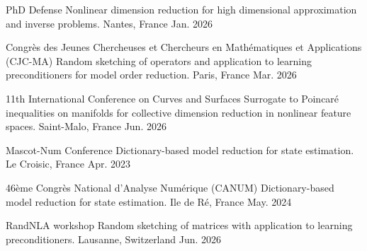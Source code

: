 \begin{cvpresentations}

\cvpresentation
{PhD Defense} %
{Nonlinear dimension reduction for high dimensional approximation and inverse problems.} %
{Nantes, France} %
{Jan. 2026} %


\cvpresentation
{Congr\`es des Jeunes Chercheuses et Chercheurs en Mathématiques et Applications (CJC-MA)} %
{Random sketching of operators and application to learning preconditioners for model order reduction.} %
{Paris, France} %
{Mar. 2026} %


\cvpresentation
{11th International Conference on Curves and Surfaces} %
{Surrogate to Poincaré inequalities on manifolds for collective dimension reduction in nonlinear feature spaces.} %
{Saint-Malo, France} %
{Jun. 2026} %

\end{cvpresentations}


\begin{cvpresentations}


\cvpresentation
{Mascot-Num Conference} %
{Dictionary-based model reduction for state estimation.} %
{Le Croisic, France} %
{Apr. 2023} %


\cvpresentation
{46\`eme Congr\`es National d'Analyse Num\'erique (CANUM)} %
{Dictionary-based model reduction for state estimation.} %
{Ile de Ré, France} %
{May. 2024} %


\cvpresentation
{RandNLA workshop} %
{Random sketching of matrices with application to learning preconditioners.} %
{Lausanne, Switzerland} %
{Jun. 2026} %


\end{cvpresentations}